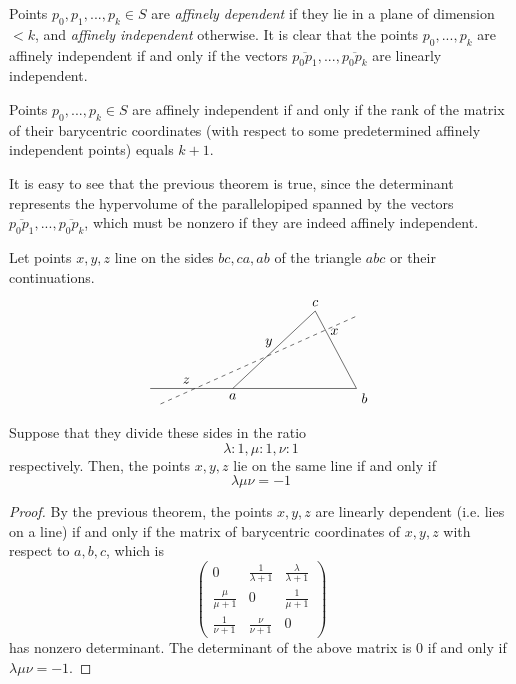 \documentclass{article}
\begin{document}
    \begin{definition}
      Points $p_0, p_1, ..., p_k \in S$ are \textit{affinely dependent} if they lie in a plane of dimension $<k$, and \textit{affinely independent} otherwise. It is clear that the points $p_0,..., p_k$ are affinely independent if and only if the vectors $\overline{p_0p_1}, ..., \overline{p_0 p_k}$ are linearly independent. 
    \end{definition}

    \begin{theorem}
      Points $p_0, ..., p_k \in S$ are affinely independent if and only if the rank of the matrix of their barycentric coordinates (with respect to some predetermined affinely independent points) equals $k+1$. 
    \end{theorem}

    It is easy to see that the previous theorem is true, since the determinant represents the hypervolume of the parallelopiped spanned by the vectors $\overline{p_0p_1}, ..., \overline{p_0 p_k}$, which must be nonzero if they are indeed affinely independent. 

    \begin{corollary}
      Let points $x, y, z$ line on the sides $bc, ca, ab$ of the triangle $abc$ or their continuations. 
      \[\begin{tikzpicture}[scale=1.3]
        \draw (-1,0)--(3,0)--(2.2, 1.5)--(0.6,0);
        \node[below] at (0.6, 0) {$a$};
        \node[below right] at (3,0) {$b$};
        \node[above] at (2.2, 1.5) {$c$};
        \draw[dashed] (-0.8,-0.3)--(3,1.4);
        \node[above] at (-0.3, 0) {$z$};
        \node[above] at (1.3, 0.7) {$y$};
        \node[right] at (2.4, 1.1) {$x$};
      \end{tikzpicture}\]
      Suppose that they divide these sides in the ratio 
      \[\lambda: 1, \mu: 1, \nu: 1\]
      respectively. Then, the points $x, y, z$ lie on the same line if and only if 
      \[\lambda \mu \nu = -1\]
    \end{corollary}
    \begin{proof}
    By the previous theorem, the points $x, y, z$ are linearly dependent (i.e. lies on a line) if and only if the matrix of barycentric coordinates of $x, y, z$ with respect to $a, b, c$, which is
    \begin{equation}
      \begin{pmatrix}
      0 & \frac{1}{\lambda + 1} & \frac{\lambda}{\lambda + 1} \\
      \frac{\mu}{\mu + 1} & 0 & \frac{1}{\mu + 1} \\
      \frac{1}{\nu + 1} & \frac{\nu}{\nu+1} & 0
      \end{pmatrix}
    \end{equation}
    has nonzero determinant. The determinant of the above matrix is $0$ if and only if $\lambda \mu \nu = -1$. 
    \end{proof}
\end{document}
